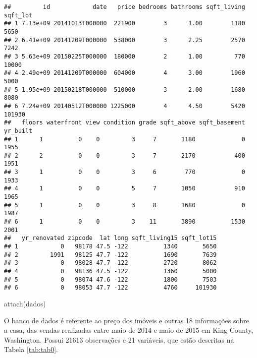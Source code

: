 \documentclass[
]{article}
\newenvironment{Shaded}{\begin{snugshade}}{\end{snugshade}}
\newcommand{\FunctionTok}[1]{\textcolor[rgb]{0.00,0.00,0.00}{#1}}
\newcommand{\NormalTok}[1]{#1}
\begin{document}
\begin{verbatim}
##         id            date   price bedrooms bathrooms sqft_living sqft_lot
## 1 7.13e+09 20141013T000000  221900        3      1.00        1180     5650
## 2 6.41e+09 20141209T000000  538000        3      2.25        2570     7242
## 3 5.63e+09 20150225T000000  180000        2      1.00         770    10000
## 4 2.49e+09 20141209T000000  604000        4      3.00        1960     5000
## 5 1.95e+09 20150218T000000  510000        3      2.00        1680     8080
## 6 7.24e+09 20140512T000000 1225000        4      4.50        5420   101930
##   floors waterfront view condition grade sqft_above sqft_basement yr_built
## 1      1          0    0         3     7       1180             0     1955
## 2      2          0    0         3     7       2170           400     1951
## 3      1          0    0         3     6        770             0     1933
## 4      1          0    0         5     7       1050           910     1965
## 5      1          0    0         3     8       1680             0     1987
## 6      1          0    0         3    11       3890          1530     2001
##   yr_renovated zipcode  lat long sqft_living15 sqft_lot15
## 1            0   98178 47.5 -122          1340       5650
## 2         1991   98125 47.7 -122          1690       7639
## 3            0   98028 47.7 -122          2720       8062
## 4            0   98136 47.5 -122          1360       5000
## 5            0   98074 47.6 -122          1800       7503
## 6            0   98053 47.7 -122          4760     101930
\end{verbatim}

\begin{Shaded}
\begin{Highlighting}[]
\FunctionTok{attach}\NormalTok{(dados)}
\end{Highlighting}
\end{Shaded}

O banco de dados é referente ao preço dos imóveis e outras 18 informações sobre a casa, das vendas realizadas entre maio de 2014 e maio de 2015 em King County, Washington. Possui 21613 observações e 21 variáveis, que estão descritas na Tabela \ref{tab:tab0}.
\end{document}
